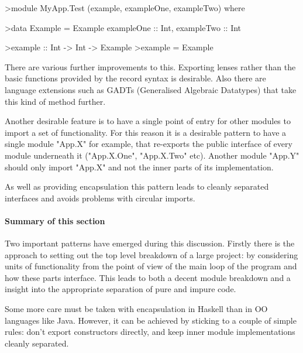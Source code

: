 \begin{haskell}
>module MyApp.Test (example, exampleOne, exampleTwo) where

>data Example = Example { exampleOne :: Int, exampleTwo :: Int }

>example :: Int -> Int -> Example
>example = Example

\end{haskell}
\noindent
There are various further improvements to this. Exporting lenses rather than the basic functions provided by the record syntax is desirable. Also there are language extensions such as GADTs (Generalised Algebraic Datatypes) that take this kind of method further.

Another desirable feature is to have a single point of entry for other modules to import a set of functionality. For this reason it is a desirable pattern to have a single module "App.X" for example, that re-exports the public interface of every module underneath it ("App.X.One", "App.X.Two" etc). Another module "App.Y" should only import "App.X" and not the inner parts of its implementation.

As well as providing encapsulation this pattern leads to cleanly separated interfaces and avoids problems with circular imports. 

\paragraph{Summary of this section} Two important patterns have emerged during this discussion. Firstly there is the approach to setting out the top level breakdown of a large project: by considering units of functionality from the point of view of the main loop of the program and how these parts interface. This leads to both a decent module breakdown and a insight into the appropriate separation of pure and impure code.

Some more care must be taken with encapsulation in Haskell than in OO languages like Java. However, it can be achieved by sticking to a couple of simple rules: don't export constructors directly, and keep inner module implementations cleanly separated.
